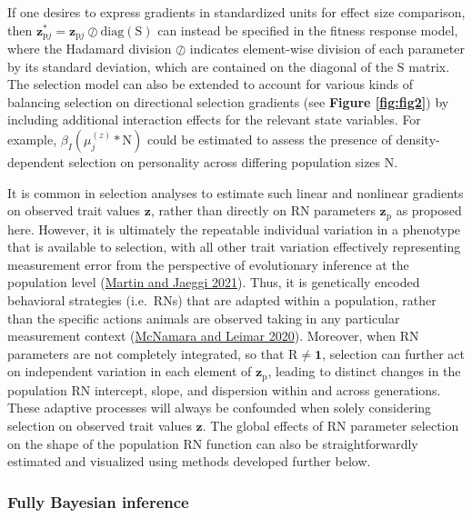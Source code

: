 \documentclass{article}
\begin{document}
If one desires to express gradients in standardized units for effect
size comparison, then
\(\boldsymbol{z}^*_{\boldsymbol{\mathrm{p}}j}=\boldsymbol{z}_{\boldsymbol{\mathrm{p}}j}\oslash \mathrm{diag}(\boldsymbol{\mathrm{S}})\)
can instead be specified in the fitness response model, where the
Hadamard division \(\oslash\) indicates element-wise division of each
parameter by its standard deviation, which are contained on the diagonal
of the \(\boldsymbol{\mathrm{S}}\) matrix. The selection model can also
be extended to account for various kinds of balancing selection on
directional selection gradients (see \textbf{Figure \ref{fig:fig2}}) by
including additional interaction effects for the relevant state
variables. For example, \(\beta_{I} ( \mu^{(z)}_{j} * \mathrm{N} )\)
could be estimated to assess the presence of density-dependent selection
on personality across differing population sizes \(\mathrm{N}\).

It is common in selection analyses to estimate such linear and nonlinear
gradients on observed trait values \(\boldsymbol{z}\), rather than
directly on RN parameters \(\boldsymbol{z}_{\boldsymbol{\mathrm{p}}}\)
as proposed here. However, it is ultimately the repeatable individual
variation in a phenotype that is available to selection, with all other
trait variation effectively representing measurement error from the
perspective of evolutionary inference at the population level
(\protect\hyperlink{ref-Martin2021}{Martin and Jaeggi 2021}). Thus, it
is genetically encoded behavioral strategies (i.e.~RNs) that are adapted
within a population, rather than the specific actions animals are
observed taking in any particular measurement context
(\protect\hyperlink{ref-McNamara2020}{McNamara and Leimar 2020}).
Moreover, when RN parameters are not completely integrated, so that
\(\boldsymbol{\mathrm{R}} \neq \boldsymbol{1}\), selection can further
act on independent variation in each element of
\(\boldsymbol{z}_{\boldsymbol{\mathrm{p}}}\), leading to distinct
changes in the population RN intercept, slope, and dispersion within and
across generations. These adaptive processes will always be confounded
when solely considering selection on observed trait values
\(\boldsymbol{z}\). The global effects of RN parameter selection on the
shape of the population RN function can also be straightforwardly
estimated and visualized using methods developed further below.

\hypertarget{fully-bayesian-inference}{%
\subsubsection{Fully Bayesian
inference}\label{fully-bayesian-inference}}
\end{document}
